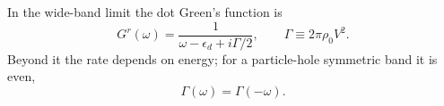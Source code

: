 \documentclass{article}
\begin{document}
In the wide-band limit the dot Green's function is
\begin{equation}
G^r(\omega) = \frac{1}{\omega-\epsilon_d+i\Gamma/2}, \qquad \Gamma \equiv 2\pi\rho_0 V^2 .
\label{eq:gr}
\end{equation}
Beyond it the rate depends on energy; for a particle-hole symmetric band it is even,
\begin{equation}
\Gamma(\omega) = \Gamma(-\omega) .
\label{eq:even}
\end{equation}
\end{document}
